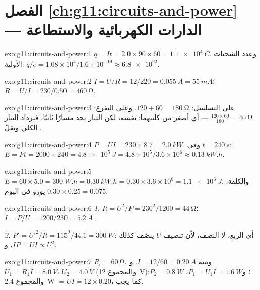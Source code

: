 \section*{الفصل \ref{ch:g11:circuits-and-power} --- الدارات الكهربائية والاستطاعة}

\begin{solution}{exo:g11:circuits-and-power:1}
$q = It = 2.0 \times 90 \times 60 = \qty{1.1e4}{C}$. وعدد الشحنات
الأولية: $q/e = 1.08\times10^{4}/1.6\times10^{-19} \approx \num{6.8e22}$.
\end{solution}

\begin{solution}{exo:g11:circuits-and-power:2}
$I = U/R = 12/220 = \qty{0.055}{A} = \qty{55}{mA}$؛
$R = U/I = 230/0.50 = \qty{460}{\ohm}$.
\end{solution}

\begin{solution}{exo:g11:circuits-and-power:3}
على التسلسل: $120 + 60 = \qty{180}{\ohm}$. وعلى التفرع: $\frac{120 \times 60}{180}
= \qty{40}{\ohm}$ --- أي أصغر من كلتيهما:  نفسه، لكن التيار
يجد مسارًا ثانيًا، فيزداد التيار الكلي وتقلّ .
\end{solution}

\begin{solution}{exo:g11:circuits-and-power:4}
$P = UI = 230 \times 8.7 = \qty{2.0}{kW}$. وفي $t = \qty{240}{s}$:
$E = Pt = 2000 \times 240 = \qty{4.8e5}{J} = 4.8\times10^{5}/3.6
\times10^{6} \approx \qty{0.13}{kW.h}$.
\end{solution}

\begin{solution}{exo:g11:circuits-and-power:5}
$E = 60 \times 5.0 = \qty{300}{W.h} = \qty{0.30}{kW.h} = 0.30 \times
3.6\times10^{6} = \qty{1.1e6}{J}$. والكلفة: $0.30 \times 0.25 = 0.075$
يورو في اليوم.
\end{solution}

\begin{solution}{exo:g11:circuits-and-power:6}
\emph{1.} $R = U^2/P = 230^2/1200 = \qty{44}{\ohm}$؛
$I = P/U = 1200/230 = \qty{5.2}{A}$.

\emph{2.} $P' = U'^2/R = 115^2/44.1 = \qty{300}{W}$: أي الربع، لا
النصف، لأن تنصيف $U$ ينصّف كذلك $I$، و$P = UI \propto U^2$.
\end{solution}

\begin{solution}{exo:g11:circuits-and-power:7}
$R_{\text{s}} = \qty{60}{\ohm}$، ومنه $I = 12/60 = \qty{0.20}{A}$.
و$U_1 = R_1 I = \qty{8.0}{V}$، $U_2 = \qty{4.0}{V}$ (والمجموع \qty{12}{V})؛
و$P_1 = U_1 I = \qty{1.6}{W}$، $P_2 = \qty{0.8}{W}$: والمجموع \qty{2.4}{W}
$= UI = 12 \times 0.20$، كما يجب.
\end{solution}

